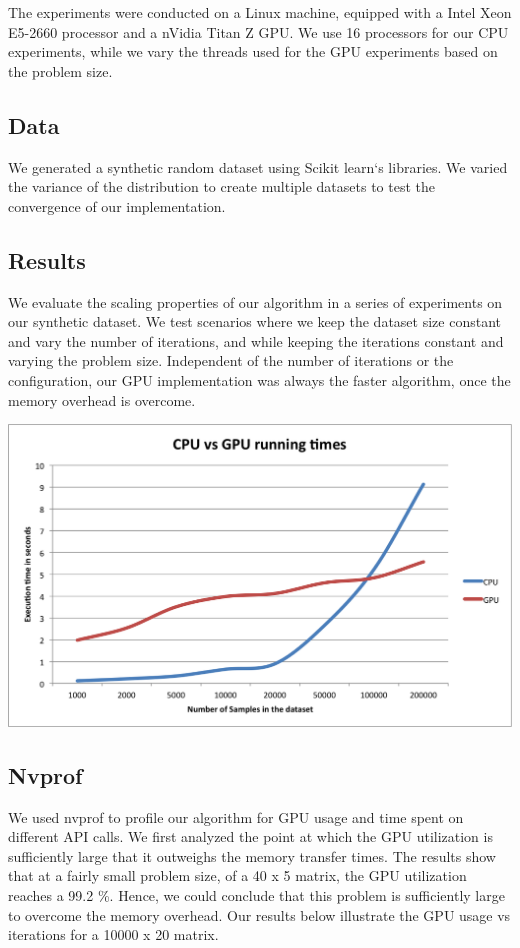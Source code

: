 \documentclass{article}
\begin{document}
The experiments were conducted on a Linux machine, equipped with a Intel Xeon E5-2660 processor and a nVidia Titan Z GPU. We use 16 processors for our CPU experiments, while we vary the threads used for the GPU experiments based on the problem size.

\subsection{Data}

We generated a synthetic random dataset using Scikit learn`s libraries. We varied the variance of the distribution to create multiple datasets to test the convergence of our implementation.

\subsection{Results}

We evaluate the scaling properties of our algorithm in a series of experiments on our synthetic dataset. We test scenarios where we keep the dataset size constant and vary the number of iterations, and while keeping the iterations constant and varying the problem size. Independent of the number of iterations or the configuration, our GPU implementation was always the faster algorithm, once the memory overhead is overcome.

\includegraphics[scale=0.75]{cpuvgpu.png}


\subsection{Nvprof}

We used nvprof to profile our algorithm for GPU usage and time spent on different API calls. We first analyzed the point at which the GPU utilization is sufficiently large that it outweighs the memory transfer times. The results show that at a fairly small problem size, of a 40 x 5 matrix, the GPU utilization reaches a 99.2 \%. Hence, we could conclude that this problem is sufficiently large to overcome the memory overhead. Our results below illustrate the GPU usage vs iterations for a 10000 x 20 matrix.
\end{document}
